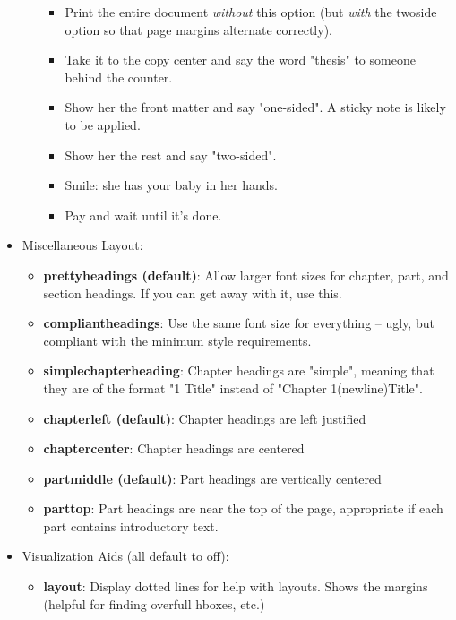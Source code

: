 \documentclass[phd,electronic,letterpaper,chaptercenter,parttop]{byumsphd}
\begin{document}
\begin{itemize}
\begin{itemize}
              \begin{itemize}
                \item Print the entire document \emph{without} this option (but \emph{with} the twoside option so that page margins alternate correctly).
                \item Take it to the copy center and say the word "thesis" to someone behind the counter.
                \item Show her the front matter and say "one-sided".  A sticky note is likely to be applied.
                \item Show her the rest and say "two-sided".
                \item Smile: she has your baby in her hands.
                \item Pay and wait until it's done.
              \end{itemize}
        \end{itemize}
    \item Miscellaneous Layout:
        \begin{itemize}
            \item \textbf{prettyheadings (default)}: Allow larger font sizes for chapter, part, and section headings.  If you can get away with it, use this.
            \item \textbf{compliantheadings}: Use the same font size for everything -- ugly, but compliant with the minimum style requirements.
            \item \textbf{simplechapterheading}: Chapter headings are "simple", meaning that they are of the format "1 Title" instead of "Chapter 1(newline)Title".
            \item \textbf{chapterleft (default)}: Chapter headings are left justified
            \item \textbf{chaptercenter}: Chapter headings are centered
            \item \textbf{partmiddle (default)}: Part headings are vertically centered
            \item \textbf{parttop}: Part headings are near the top of the page, appropriate if each part contains introductory text.
        \end{itemize}
\pagebreak
    \item Visualization Aids (all default to off):
        \begin{itemize}
            \item \textbf{layout}: Display dotted lines for help with layouts.  Shows the margins (helpful for finding overfull hboxes, etc.)

\end{itemize}
\end{itemize}
\end{document}
